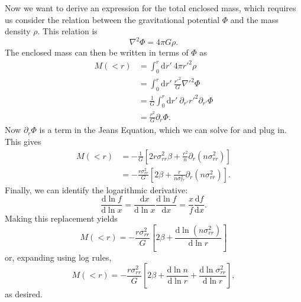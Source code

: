 \documentclass{article}
\renewcommand{\d}{\mathrm{d}}
\begin{document}
Now we want to derive an expression for the total enclosed mass, which requires
us consider the relation between the gravitational potential $\Phi$ and the
mass density $\rho$. This relation is
\begin{equation}
	\nabla^2 \Phi = 4 \pi G \rho.
\end{equation}
The enclosed mass can then be written in terms of $\Phi$ as
\begin{align}
	M(<r)
	&= \int_0^r \d r' \ 4 \pi r'^2 \rho \\
	&= \int_0^r \d r' \ \frac{r'^2}{G} \nabla'^2 \Phi \\
	&= \frac{1}{G} \int_0^r \d r' \ \partial_{r'} r'^2 \partial_{r'} \Phi \\
	&= \frac{r^2}{G} \partial_r \Phi.
\end{align}
Now $\partial_r \Phi$ is a term in the Jeans Equation, which we can solve for
and plug in. This gives
\begin{align}
	M(<r)
	&= -\frac{1}{G} \left[
		2 r \sigma_{rr}^2 \beta
		+ \frac{r^2}{n} \partial_r (n \sigma_{rr}^2)
	\right] \\
	&= -\frac{r \sigma_{rr}^2}{G} \left[
		2 \beta
		+ \frac{r}{n \sigma_{rr}^2} \partial_r (n \sigma_{rr}^2)
	\right].
\end{align}
Finally, we can identify the logarithmic derivative:
\begin{equation}
	\frac{\d \ln f}{\d \ln x}
	= \frac{\d x}{\d \ln x} \frac{\d \ln f}{\d x}
	= \frac{x}{f} \frac{\d f}{\d x}.
\end{equation}
Making this replacement yields
\begin{equation}
	M(<r)
	= -\frac{r \sigma_{rr}^2}{G} \left[
		2 \beta
		+ \frac{\d \ln (n \sigma_{rr}^2)}{\d \ln r}
	\right]
\end{equation}
or, expanding using log rules,
\begin{equation}
	M(<r)
	= -\frac{r \sigma_{rr}^2}{G} \left[
		2 \beta
		+ \frac{\d \ln n}{\d \ln r}
		+ \frac{\d \ln \sigma_{rr}^2}{\d \ln r}
	\right],
\end{equation}
as desired.
\end{document}
